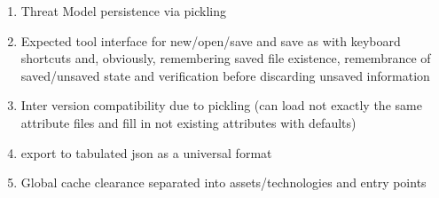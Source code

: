 \begin{enumerate}
\begin{enumerate}
		\item Threat Model persistence via pickling
		\item Expected tool interface for new/open/save and save as with keyboard shortcuts and, obviously, remembering saved file existence, remembrance of saved/unsaved state and verification before discarding unsaved information
		\item Inter version compatibility due to pickling (can load not exactly the same attribute files and fill in not existing attributes with defaults)
		\item export to tabulated json as a universal format
		\item Global cache clearance separated into assets/technologies and entry points
	\end{enumerate}
  
\end{enumerate}

